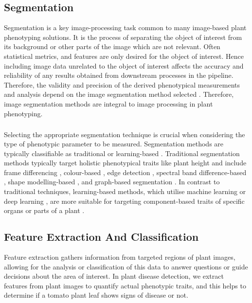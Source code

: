 \subsection{Segmentation}
Segmentation is a key image-processing task common to many image-based plant phenotyping solutions. It is the process of separating the object of interest from its background or other parts of the image which are not relevant.  Often statistical metrics, and features are only desired for the object of interest. Hence including image data unrelated to the object of interest affects the accuracy and reliability of any results obtained from downstream processes in the pipeline. Therefore, the validity and precision of the derived phenotypical measurements and analysis depend on the image segmentation method selected \cite{choudhurySegmentationTechniquesChallenges2020, muller-linowPlantScreenMobile2019}. Therefore, image segmentation methods are integral to image processing in plant phenotyping.

\subparagraph{}
Selecting the appropriate segmentation technique is crucial when considering the type of phenotypic parameter to be measured. Segmentation methods are typically classifiable as traditional or learning-based \cite{choudhurySegmentationTechniquesChallenges2020}. Traditional segmentation methods typically target holistic phenotypical traits like plant height and include frame differencing \cite{daschoudhuryHolisticComponentPlant2018}, colour-based \cite{hamudaSurveyImageProcessing2016a}, edge detection \cite{wangImageSegmentationOverlapping2018}, spectral band difference-based \cite{gampaDatadrivenApproachDetecting2019}, shape modelling-based \cite{chenLeafSegmentationFunctional2019}, and graph-based segmentation \cite{praveenkumarImageBasedLeaf2019}. In contrast to traditional techniques, learning-based methods, which utilise machine learning or deep learning \cite{papeUtilizingMachineLearning2015, abdallaFinetuningConvolutionalNeural2019}, are more suitable for targeting component-based traits of specific organs or parts of a plant \cite{choudhurySegmentationTechniquesChallenges2020}.

\subsection{Feature Extraction And Classification}
Feature extraction gathers information from targeted regions of plant images, allowing for the analysis or classification of this data to answer questions or guide decisions about the area of interest. In plant disease detection, we extract features from plant images to quantify actual phenotypic traits, and this helps to determine if a tomato plant leaf shows signs of disease or not.

